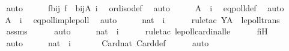 \begin{isabellebody}
\ \ \ \ \isamarkupfalse%
\ auto\isanewline
\ \ \isamarkupfalse%
\ \isamarkupfalse%
\ fbij{\isacharcolon}{\kern0pt}\ {\isachardoublequoteopen}f\ {\isasymin}\ bij{\isacharparenleft}{\kern0pt}A{\isacharcomma}{\kern0pt}\ i{\isacharparenright}{\kern0pt}{\isachardoublequoteclose}\ \isamarkupfalse%
\ ord{\isacharunderscore}{\kern0pt}iso{\isacharunderscore}{\kern0pt}def\ \isamarkupfalse%
\ auto\isanewline
\ \ \isamarkupfalse%
\ \isamarkupfalse%
\ {\isachardoublequoteopen}A\ {\isasymapprox}\ i{\isachardoublequoteclose}\ \isamarkupfalse%
\ eqpoll{\isacharunderscore}{\kern0pt}def\ \isamarkupfalse%
\ auto\isanewline
\ \ \isamarkupfalse%
\ \isamarkupfalse%
\ {\isachardoublequoteopen}A\ {\isasymlesssim}\ i{\isachardoublequoteclose}\ \isamarkupfalse%
\ eqpoll{\isacharunderscore}{\kern0pt}imp{\isacharunderscore}{\kern0pt}lepoll\ \isamarkupfalse%
\ auto\isanewline
\ \ \isamarkupfalse%
\ \isamarkupfalse%
\ {\isachardoublequoteopen}nat\ {\isasymlesssim}\ i{\isachardoublequoteclose}\ \isanewline
\ \ \ \ \isamarkupfalse%
{\isacharparenleft}{\kern0pt}rule{\isacharunderscore}{\kern0pt}tac\ Y{\isacharequal}{\kern0pt}{\isachardoublequoteopen}A{\isachardoublequoteclose}\ \ lepoll{\isacharunderscore}{\kern0pt}trans{\isacharparenright}{\kern0pt}\isanewline
\ \ \ \ \isamarkupfalse%
\ assms\isanewline
\ \ \ \ \isamarkupfalse%
\ auto\isanewline
\ \ \isamarkupfalse%
\ \isamarkupfalse%
\ {\isachardoublequoteopen}{\isacharbar}{\kern0pt}nat{\isacharbar}{\kern0pt}\ {\isasymle}\ i{\isachardoublequoteclose}\ \isanewline
\ \ \ \ \isamarkupfalse%
{\isacharparenleft}{\kern0pt}rule{\isacharunderscore}{\kern0pt}tac\ lepoll{\isacharunderscore}{\kern0pt}cardinal{\isacharunderscore}{\kern0pt}le{\isacharparenright}{\kern0pt}\isanewline
\ \ \ \ \isamarkupfalse%
\ fiH\ \isanewline
\ \ \ \ \isamarkupfalse%
\ auto\isanewline
\ \ \isamarkupfalse%
\ \isamarkupfalse%
\ {\isachardoublequoteopen}nat\ {\isasymle}\ i{\isachardoublequoteclose}\ \isanewline
\ \ \ \ \isamarkupfalse%
\ Card{\isacharunderscore}{\kern0pt}nat\ Card{\isacharunderscore}{\kern0pt}def\isanewline
\ \ \ \ \isamarkupfalse%
\ auto\isanewline
\ \ \isamarkupfalse%
\ \isamarkupfalse%

\end{isabellebody}
